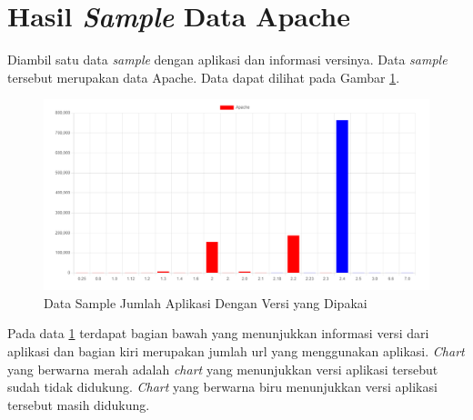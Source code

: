 \section{Hasil \textit{Sample} Data Apache}
Diambil satu data \textit{sample} dengan aplikasi dan informasi versinya. Data \textit{sample} tersebut merupakan data Apache. Data dapat dilihat pada Gambar \ref{fig:data_sample_res}.
\begin{figure}[H]
\centering  
\includegraphics[scale=0.7]{Gambar/apache.PNG}  
\caption{Data Sample Jumlah Aplikasi Dengan Versi yang Dipakai} 
\label{fig:data_sample_res} 
\end{figure}
Pada data \ref{fig:data_sample_res} terdapat bagian bawah yang menunjukkan informasi versi dari aplikasi dan bagian kiri merupakan jumlah url yang menggunakan aplikasi. \textit{Chart} yang berwarna merah adalah \textit{chart} yang menunjukkan versi aplikasi tersebut sudah tidak didukung. \textit{Chart} yang berwarna biru menunjukkan versi aplikasi tersebut masih didukung.